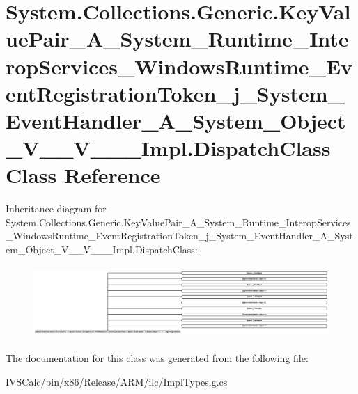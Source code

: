 \hypertarget{class_system_1_1_collections_1_1_generic_1_1_key_value_pair___a___system___runtime___interop_ser48692d438987bd0580f5efab43944bc3}{}\section{System.\+Collections.\+Generic.\+Key\+Value\+Pair\+\_\+\+A\+\_\+\+System\+\_\+\+Runtime\+\_\+\+Interop\+Services\+\_\+\+Windows\+Runtime\+\_\+\+Event\+Registration\+Token\+\_\+j\+\_\+\+System\+\_\+\+Event\+Handler\+\_\+\+A\+\_\+\+System\+\_\+\+Object\+\_\+\+V\+\_\+\+\_\+\+V\+\_\+\+\_\+\+\_\+\+Impl.\+Dispatch\+Class Class Reference}
\label{class_system_1_1_collections_1_1_generic_1_1_key_value_pair___a___system___runtime___interop_ser48692d438987bd0580f5efab43944bc3}
Inheritance diagram for System.\+Collections.\+Generic.\+Key\+Value\+Pair\+\_\+\+A\+\_\+\+System\+\_\+\+Runtime\+\_\+\+Interop\+Services\+\_\+\+Windows\+Runtime\+\_\+\+Event\+Registration\+Token\+\_\+j\+\_\+\+System\+\_\+\+Event\+Handler\+\_\+\+A\+\_\+\+System\+\_\+\+Object\+\_\+\+V\+\_\+\+\_\+\+V\+\_\+\+\_\+\+\_\+\+Impl.\+Dispatch\+Class\+:\begin{figure}[H]
\begin{center}
\leavevmode
\includegraphics[height=2.747547cm]{class_system_1_1_collections_1_1_generic_1_1_key_value_pair___a___system___runtime___interop_ser48692d438987bd0580f5efab43944bc3}
\end{center}
\end{figure}


The documentation for this class was generated from the following file\+:\begin{DoxyCompactItemize}
\item 
I\+V\+S\+Calc/bin/x86/\+Release/\+A\+R\+M/ilc/Impl\+Types.\+g.\+cs\end{DoxyCompactItemize}
